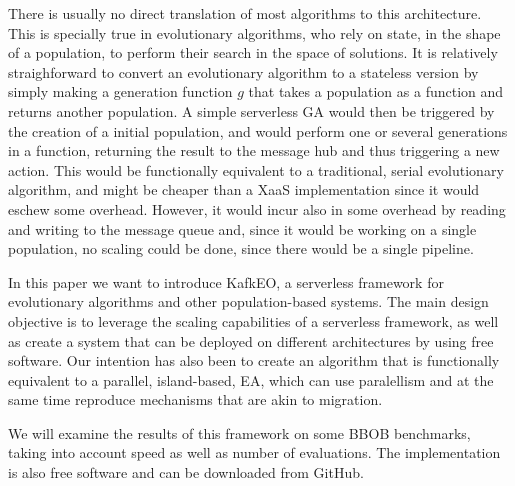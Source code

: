 \documentclass[sigconf]{acmart}
\begin{document}
There is usually no direct translation of most algorithms to this
architecture. This is specially true in evolutionary algorithms, who
rely on state, in the shape of a population, to perform their search
in the space of solutions. It is relatively straighforward to convert
an evolutionary algorithm to a stateless version by simply making a
{\sf generation} function $g$ that takes a population as a function
and returns another population. A simple serverless GA would then be
triggered by the creation of a initial population, and would perform
one or several generations in a function, returning the result to the
message hub and thus triggering a new action. This would be
functionally equivalent to a traditional, serial evolutionary
algorithm, and might be cheaper than a XaaS implementation since it
would eschew some overhead. However, it would incur also in some
overhead by reading and writing to the message queue and, since it
would be working on a single population, no scaling could be done,
since there would be a single pipeline. 

In this paper we want to introduce KafkEO, a serverless framework for
evolutionary algorithms and other population-based systems. The main
design objective is to leverage the scaling capabilities of a
serverless framework, as well as create a system that can be deployed
on different architectures by using free software. Our intention has
also been to create an algorithm that is functionally equivalent to a
parallel, island-based, EA, which can use paralellism and at the same
time reproduce mechanisms that are akin to migration. 

We will examine the results of this framework on some BBOB benchmarks,
taking into account speed as well as number of evaluations. The
implementation is also free software and can be downloaded from
GitHub. 


\end{document}
